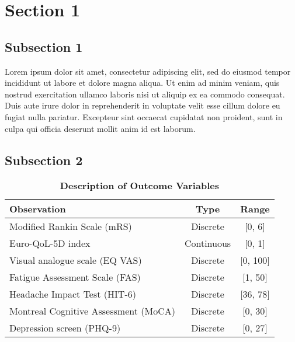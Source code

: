 

\section{Section 1}

\subsection{Subsection 1} %

Lorem ipsum dolor sit amet, consectetur adipiscing elit, sed do eiusmod tempor incididunt ut labore et dolore magna aliqua. Ut enim ad minim veniam, quis nostrud exercitation ullamco laboris nisi ut aliquip ex ea commodo consequat. Duis aute irure dolor in reprehenderit in voluptate velit esse cillum dolore eu fugiat nulla pariatur. Excepteur sint occaecat cupidatat non proident, sunt in culpa qui officia deserunt mollit anim id est laborum.


\subsection{Subsection 2} %

\begin{table}[htbp]
\centering
\caption{\textbf{Description of Outcome Variables}}
\label{tab:observations}
\begin{tabular}{p{7.5cm} c c }
\toprule
\textbf{Observation} & \textbf{Type} & \textbf{Range} \\
\midrule
Modified Rankin Scale (mRS)& Discrete & [0, 6] \\
Euro-QoL-5D index & Continuous & [0, 1] \\
Visual analogue scale (EQ VAS) & Discrete & [0, 100] \\
Fatigue Assessment Scale (FAS) & Discrete & [1, 50] \\
Headache Impact Test (HIT-6) & Discrete & [36, 78] \\
Montreal Cognitive Assessment (MoCA) & Discrete & [0, 30] \\
Depression screen (PHQ-9) & Discrete & [0, 27] \\
\bottomrule
\end{tabular}
\end{table}

